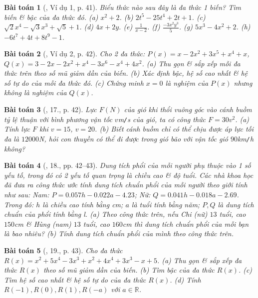 \documentclass{article}
\newtheorem{baitoan}{Bài toán}
\begin{document}
\begin{baitoan}[\cite{SBT_Toan_7_Canh_Dieu_tap_2}, Ví dụ 1, p. 41]
	Biểu thức nào sau đây là đa thức 1 biến? Tìm biến \& bậc của đa thức đó. (a) $x^2 + 2$. (b) $2t^5 - 25t^4 + 2t + 1$. (c) $\sqrt{2}x^4 - \sqrt{3}x^3 + \sqrt{5} + 1$. (d) $4x + 2y$. (e) $\frac{1}{x - 2}$. (f) $\frac{-3x^2y^3}{5}$. (g) $5x^3 - 4x^2 + 2$. (h) $-6t^7 + 4t + 8t^9 - 1$.
\end{baitoan}

\begin{baitoan}[\cite{SBT_Toan_7_Canh_Dieu_tap_2}, Ví dụ 2, p. 42]
	Cho 2 đa thức: $P(x) = x - 2x^2 + 3x^5 + x^4 + x$, $Q(x) = 3 - 2x - 2x^2 + x^4 - 3x^6 - x^4 + 4x^2$. (a) Thu gọn \& sắp xếp mỗi đa thức trên theo số mũ giảm dần của biến. (b) Xác định bậc, hệ số cao nhất \& hệ số tự do của mỗi đa thức đó. (c) Chứng minh $x = 0$ là nghiệm của $P(x)$ nhưng không là nghiệm của $Q(x)$.
\end{baitoan}

\begin{baitoan}[\cite{SBT_Toan_7_Canh_Dieu_tap_2}, 17., p. 42]
	Lực $F(N)$ của gió khi thổi vuông góc vào cánh buồm tỷ lệ thuận với bình phương vận tốc $v$\emph{m\texttt{/}s} của gió, ta có công thức $F = 30v^2$. (a) Tính lực $F$ khi $v = 15$, $v = 20$. (b) Biết cánh buồm chỉ có thể chịu được áp lực tối đa là $12000$\emph{N}, hỏi con thuyền có thể đi được trong gió bão với vận tốc gió $90$\emph{km\texttt{/}h} không?
\end{baitoan}

\begin{baitoan}[\cite{SBT_Toan_7_Canh_Dieu_tap_2}, 18., pp. 42--43]
	Dung tích phổi của mỗi người phụ thuộc vào 1 số yếu tố, trong đó có 2 yếu tố quan trọng là chiều cao \& độ tuổi. Các nhà khoa học đã đưa ra công thức ước tính dung tích chuẩn phổi của mỗi người theo giới tính như sau: Nam: $P = 0.057h - 0.022a - 4.23$; Nữ: $Q = 0.041h - 0.018a - 2.69$. Trong đó: $h$ là chiều cao tính bằng \emph{cm}; $a$ là tuổi tính bằng năm; $P,Q$ là dung tích chuẩn của phổi tính bằng \emph{l}. (a) Theo công thức trên, nếu Chi (nữ) $13$ tuổi, cao $150$\emph{cm} \& Hùng (nam) $13$ tuổi, cao $160$\emph{cm} thì dung tích chuẩn phổi của mỗi bạn là bao nhiêu? (b) Tính dung tích chuẩn phổi của mình theo công thức trên.
\end{baitoan}

\begin{baitoan}[\cite{SBT_Toan_7_Canh_Dieu_tap_2}, 19., p. 43]
	Cho đa thức $R(x) = x^2 + 5x^4 - 3x^3 + x^2 + 4x^4 + 3x^3 - x + 5$. (a) Thu gọn \& sắp xếp đa thức $R(x)$ theo số mũ giảm dần của biến. (b) Tìm bậc của đa thức $R(x)$. (c) Tìm hệ số cao nhất \& hệ số tự do của đa thức $R(x)$. (d) Tính $R(-1),R(0),R(1),R(-a)$ với $a\in\mathbb{R}$.
\end{baitoan}
\end{document}

